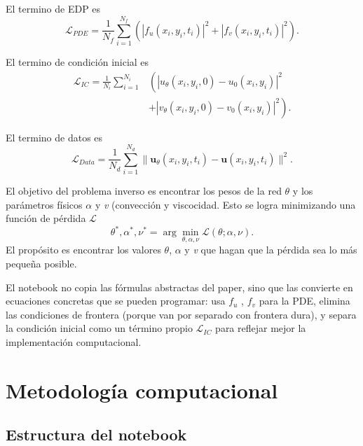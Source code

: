\documentclass[10pt,letterpaper,twocolumn]{article}
\begin{document}
El termino de EDP es
\begin{equation}
    \mathcal{L}_{PDE}=\frac{1}{N_f}\sum_{i=1}^{N_f}\left(|f_u(x_i,y_i,t_i)|^2+|f_v(x_i,y_i,t_i)|^2\right).
\end{equation}

El termino de condición inicial es
\begin{equation}
\begin{split}
    \mathcal{L}_{IC}=\frac{1}{N_i}\sum_{i=1}^{N_i}&\left(|u_\theta(x_i,y_i,0)-u_0(x_i,y_i)|^2\right.\\
    &\left.+|v_\theta(x_i,y_i,0)-v_0(x_i,y_i)|^2\right).
\end{split}
\end{equation}

El termino de datos es
\begin{equation}
    \mathcal{L}_{Data}=\frac{1}{N_d}\sum_{i=1}^{N_d}\|\mathbf{u}_\theta(x_i,y_i,t_i)-\mathbf{u}(x_i,y_i,t_i)\|^2.
\end{equation}

El objetivo del problema inverso es encontrar los pesos de la red \(\theta\) y los parámetros físicos \(\alpha\) y \textit{v} (convección y viscocidad.
Esto se logra minimizando una función de pérdida \(\mathcal{L}\)
\begin{equation}
    \theta^*,\alpha^*,\nu^*=\arg\min_{\theta,\alpha,\nu}\mathcal{L}(\theta;\alpha,\nu).
\end{equation}
El propósito es encontrar los valores \(\theta\), \(\alpha\) y \textit{v} que hagan que la pérdida sea lo más pequeña posible.

El notebook no copia las fórmulas abstractas del paper, sino que las convierte en ecuaciones concretas que se pueden programar: usa $f_u$ , $f_v$ para la PDE, elimina las condiciones de frontera (porque van por separado con frontera dura), y separa la condición inicial como un término propio $\mathcal{L}_{IC}$ para reflejar mejor la implementación computacional.

\section{Metodología computacional}

\subsection{Estructura del notebook}
\end{document}
